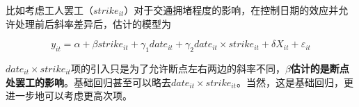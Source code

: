 \documentclass[11pt,a4paper]{ctexart}
\newcommand{\ve}{\varepsilon}
\begin{document}
比如考虑工人罢工（\(strike_{it}\)）对于交通拥堵程度的影响，在控制日期的效应并允许处理前后斜率差异后，估计的模型为

\[y_{it}=\alpha+\beta strike_{it}+\gamma_1 date_{it}+\gamma_2 date_{it}\times strike_{it}+\delta X_{it}+\ve_{it}\]

\(date_{it}\times strike_{it}\)项的引入只是为了允许断点左右两边的斜率不同，\textbf{\(\beta\)估计的是断点处罢工的影响}。基础回归甚至可以略去\(date_{it}\times strike_{it}\)。当然，这是基础回归，更进一步地可以考虑更高次项。
\end{document}
